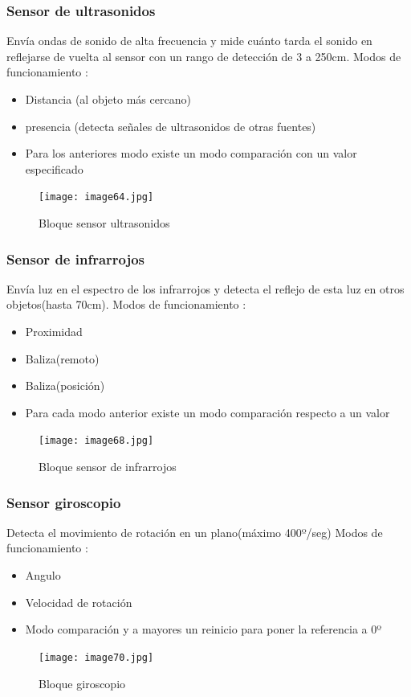 \documentclass[12pt,a4paper]{article}
\begin{document}
\subsubsection{Sensor de ultrasonidos}
Envía ondas de sonido de alta frecuencia y mide cuánto tarda el sonido en reflejarse de vuelta al sensor con un rango de detección de 3 a 250cm.
Modos de funcionamiento :
\begin{itemize}
\item Distancia (al objeto más cercano)
\item presencia (detecta señales de ultrasonidos de otras fuentes)
\item Para los anteriores modo existe un modo comparación con un valor especificado
\end{itemize}
\begin{figure}[H]
	\caption{Bloque sensor ultrasonidos}
	\texttt{[image: image64.jpg]}
	\centering
\end{figure}
\subsubsection{Sensor de infrarrojos}
Envía luz en el espectro de los infrarrojos y detecta el reflejo de esta luz en otros objetos(hasta 70cm). 
Modos de funcionamiento :
\begin{itemize}
\item Proximidad
\item Baliza(remoto)
\item Baliza(posición)
\item Para cada modo anterior existe un modo comparación respecto a un valor
\end{itemize}
\begin{figure}[H]
	\caption{Bloque sensor de infrarrojos}
	\texttt{[image: image68.jpg]}
	\centering
\end{figure}
\subsubsection{Sensor giroscopio}
Detecta el movimiento de rotación en un plano(máximo 400º/seg)
Modos de funcionamiento :
\begin{itemize}
\item Angulo
\item Velocidad de rotación
\item Modo comparación y a mayores un reinicio para poner la referencia a 0º
\end{itemize}
\begin{figure}[H]
	\caption{Bloque giroscopio}
	\texttt{[image: image70.jpg]}
	\centering
\end{figure}
\end{document}
